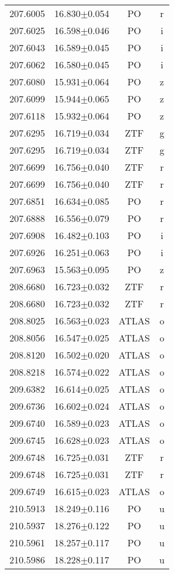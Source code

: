 \begin{table}
\begin{tabular}{cccc}
207.6005 & 16.830$\pm$0.054 & PO & r \\
207.6025 & 16.598$\pm$0.046 & PO & i \\
207.6043 & 16.589$\pm$0.045 & PO & i \\
207.6062 & 16.580$\pm$0.045 & PO & i \\
207.6080 & 15.931$\pm$0.064 & PO & z \\
207.6099 & 15.944$\pm$0.065 & PO & z \\
207.6118 & 15.932$\pm$0.064 & PO & z \\
207.6295 & 16.719$\pm$0.034 & ZTF & g \\
207.6295 & 16.719$\pm$0.034 & ZTF & g \\
207.6699 & 16.756$\pm$0.040 & ZTF & r \\
207.6699 & 16.756$\pm$0.040 & ZTF & r \\
207.6851 & 16.634$\pm$0.085 & PO & r \\
207.6888 & 16.556$\pm$0.079 & PO & r \\
207.6908 & 16.482$\pm$0.103 & PO & i \\
207.6926 & 16.251$\pm$0.063 & PO & i \\
207.6963 & 15.563$\pm$0.095 & PO & z \\
208.6680 & 16.723$\pm$0.032 & ZTF & r \\
208.6680 & 16.723$\pm$0.032 & ZTF & r \\
208.8025 & 16.563$\pm$0.023 & ATLAS & o \\
208.8056 & 16.547$\pm$0.025 & ATLAS & o \\
208.8120 & 16.502$\pm$0.020 & ATLAS & o \\
208.8218 & 16.574$\pm$0.022 & ATLAS & o \\
209.6382 & 16.614$\pm$0.025 & ATLAS & o \\
209.6736 & 16.602$\pm$0.024 & ATLAS & o \\
209.6740 & 16.589$\pm$0.023 & ATLAS & o \\
209.6745 & 16.628$\pm$0.023 & ATLAS & o \\
209.6748 & 16.725$\pm$0.031 & ZTF & r \\
209.6748 & 16.725$\pm$0.031 & ZTF & r \\
209.6749 & 16.615$\pm$0.023 & ATLAS & o \\
210.5913 & 18.249$\pm$0.116 & PO & u \\
210.5937 & 18.276$\pm$0.122 & PO & u \\
210.5961 & 18.257$\pm$0.117 & PO & u \\
210.5986 & 18.228$\pm$0.117 & PO & u \\

\end{tabular}
\end{table}
